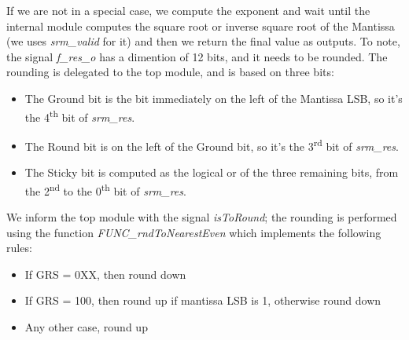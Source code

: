 If we are not in a special case, we compute the exponent and wait until the internal module computes the square root or inverse square root of the Mantissa (we uses  \emph{srm\_valid} for it) and then we return the final value as outputs. To note, the signal \emph{f\_res\_o} has a dimention of 12 bits, and it needs to be rounded. The rounding is delegated to the top module, and is based on three bits:
\begin{itemize}
\item The Ground bit is the bit immediately on the left of the Mantissa LSB, so it's the 4\textsuperscript{th} bit of \emph{srm\_res}.
\item The Round bit is on the left of the Ground bit, so it's the 3\textsuperscript{rd} bit of \emph{srm\_res}.
\item The Sticky bit is computed as the logical or of the three remaining bits, from the 2\textsuperscript{nd} to the 0\textsuperscript{th} bit of \emph{srm\_res}. 
\end{itemize}

We inform the top module with the signal \emph{isToRound}; the rounding is performed using the function \emph{FUNC\_rndToNearestEven} which implements the following rules:
\begin{itemize}
\item If GRS = 0XX, then round down
\item If GRS = 100, then round up if mantissa LSB is 1, otherwise round down
\item Any other case, round up
\end{itemize} 

\clearpage
